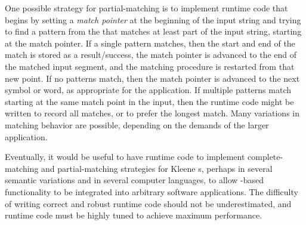 One possible strategy for partial-matching is to implement runtime code that
begins by setting a \emph{match pointer} at the beginning of the input string and trying
to find a pattern from the \fsm{} that matches at least part of the input string, starting at the
match pointer.  If a single pattern matches, then the start and end of the match is
stored as a result/success, the match pointer is advanced to the end of the matched input
segment, and the
matching procedure is
restarted from that new point.  If no patterns match, then the match pointer is
advanced to the next symbol or word, as appropriate for the application.  If multiple
patterns match starting at the same match point in the input, then the runtime code might be
written to record all matches, or to prefer the longest match.
Many variations in matching behavior are possible, depending on the demands of the larger
application.  

Eventually, it would be useful to have runtime code to implement complete-matching and
partial-matching strategies for Kleene \fsm{}s, perhaps in several semantic variations and in
several computer languages, to allow \fsm{}-based functionality to be integrated into arbitrary
software applications.  The difficulty of writing correct and robust runtime code should not be
underestimated, and runtime code must be highly tuned to achieve maximum performance.

